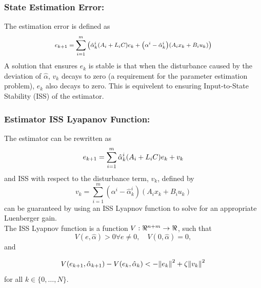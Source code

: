\documentclass[]{article}
\begin{document}
\subsubsection{State Estimation Error:}
The estimation error is defined as
\begin{equation} \label{eq:DE_state_error}
	\medmath{e_{k+1} = \sum_{i=1}^m \qty(\hat{\alpha}_k^i\qty(A_i + L_i C)e_k + \qty(\alpha^i - \hat{\alpha}_k^i)\qty(A_i x_k + B_i u_k))}
\end{equation}
A solution that ensures $e_k$ is stable is that when the disturbance caused by the deviation of $\hat{\alpha}$, $v_k$ decays to zero (a requirement for the parameter estimation problem), $e_k$ also decays to zero. This is equivelent to ensuring Input-to-State Stability (ISS) of the estimator.\\

\subsubsection{Estimator ISS Lyapanov Function:}
The estimator can be rewritten as
\begin{equation}\label{eq:DE_state_error_simple}
	e_{k+1} = \sum_{i=1}^m \hat{\alpha}_k^i \qty(A_i + L_i C) e_k + v_k
\end{equation}
and ISS with respect to the disturbance term, $v_k$, defined by
\begin{equation}
	v_k = \sum_{i=1}^m (\alpha^i - \hat{\alpha}_k^i) (A_i x_k + B_i u_k)
\end{equation}
can be guaranteed by using an ISS Lyapnov function to solve for an appropriate Luenberger gain.\\
The ISS Lyapnov function is a function $V : \real^{n+m} \to \real$, such that $$V(e,\hat{\alpha})>0 \forall e\neq 0, \quad V(0,\hat{\alpha}) = 0,$$ and

\begin{equation}
	V(e_{k+1}, \hat{\alpha}_{k+1}) - V(e_k, \hat{\alpha}_k) < -\norm{e_k}^2 + \zeta \norm{v_k}^2
\end{equation}
for all $k \in \{0, \dots,N\}$.

\newpage
\end{document}
